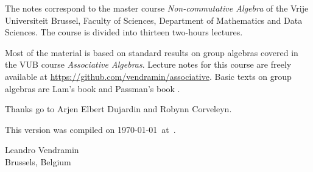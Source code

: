 \preface

The notes correspond to the master  
course \emph{Non-commutative Algebra} of the 
Vrije Universiteit Brussel, 
Faculty of Sciences, 
Department of Mathematics and Data Sciences. The course
is divided into thirteen two-hours lectures. 

Most of the material is based on standard 
results on group algebras covered in the VUB course \emph{Associative Algebras}. Lecture  
notes for this course are freely available at 
\url{https://github.com/vendramin/associative}. 
Basic texts on group algebras are Lam's book \cite{MR1125071}
and Passman's book \cite{MR798076}.

 
Thanks go to Arjen Elbert Dujardin and Robynn Corveleyn. 

This version 
was compiled on \today~at~\currenttime.

\bigskip
\begin{flushright}
Leandro Vendramin\\Brussels, Belgium\par
\end{flushright}
